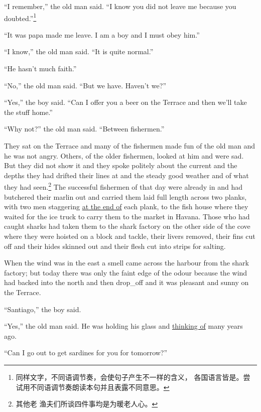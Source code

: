 \documentclass[fontset=ubuntu,zihao=-4]{ctexrep}
\newlength{\drop}%
\begin{document}
``I remember,'' the old man said. ``I know you did not leave me because you
\gls{doubted}.''\footnote{同样文字，不同语调节奏，会使句子产生不一样的含义，
  各国语言皆是。尝试用不同语调节奏朗读本句并且表露不同意思。}

``It was papa made me leave. I am a boy and I must \gls{obey} him.''

``I know,'' the old man said. ``It is quite normal.''

``He hasn't much \gls{faith}.''

``No,'' the old man said. ``But we have. Haven't we?''

``Yes,'' the boy said. ``Can I offer you a beer on the \gls{Terrace} and then we'll take the \gls{stuff} home.''

``Why not?'' the old man said. ``Between fishermen.''

They sat on the Terrace and many of the fishermen made fun of the old man
and he was not angry. Others, of the older fishermen, looked at him and were
sad. But they did not show it and they spoke \gls{politely} about the
\gls{current} and the \glspl{depth} they had \gls{drifted} their lines at
and the \gls{steady} good weather and of what they had seen.\footnote{其他老
  渔夫们所谈四件事均是为暖老人心。} The successful fishermen of that day
were already in and had \gls{butchered} their \gls{marlin} out and carried
them \gls{laid} full length across two \glspl{plank}, with two men
\gls{staggering} \uline{at the end of} each plank, to the fish house where
they waited for the ice truck to carry them to the market in Havana. Those
who had caught \glspl{shark} had taken them to the shark factory on
the other side of the \gls{cove} where they were \gls{hoisted} on a
\gls{block} and \gls{tackle}, their \glspl{liver} removed, their \glspl{fin}
cut off and their \glspl{hide} \gls{skinned} out and their \gls{flesh} cut
into \glspl{strip} for salting.

When the wind was in the east a smell came across the \gls{harbour} from the
shark factory; but today there was only the \gls{faint} \gls{edge} of the
\gls{odour} because the wind had backed into the north and then \gls{drop_off}
and it was \gls{pleasant} and sunny on the Terrace.

``Santiago,'' the boy said.

``Yes,'' the old man said. He was holding his glass and \uline{thinking of}
many years ago.

``Can I go out to get \glspl{sardine} for you for tomorrow?''
\end{document}
